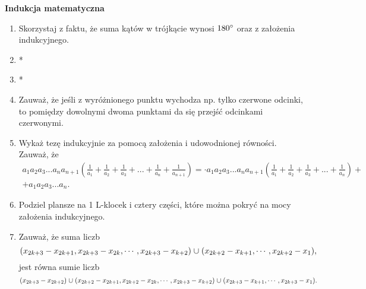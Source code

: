 \newpage
\begin{center}
	\textbf{Indukcja matematyczna}
\end{center}

\begin{enumerate}
	\item Skorzystaj z faktu, że suma kątów w trójkącie wynosi $180\degree$ oraz z założenia indukcyjnego.

	\item *

	\item *

	\item Zauważ, że jeśli z wyróżnionego punktu wychodza np. tylko czerwone odcinki, to pomiędzy dowolnymi dwoma punktami da się przejść odcinkami czerwonymi.

	\item Wykaż tezę indukcyjnie za pomocą założenia i udowodnionej równości. Zauważ, że 
	\begin{align*}
		a_1a_2a_3...a_na_{n+1}\left(\frac{1}{a_1} + \frac{1}{a_2} + \frac{1}{a_3} + ... + \frac{1}{a_n} + \frac{1}{a_{n + 1}}\right) =  \cdot a_1a_2a_3...a_na_{n+1}\left(\frac{1}{a_1} + \frac{1}{a_2} + \frac{1}{a_3} + ... + \frac{1}{a_n}\right) + \\ + a_1a_2a_3...a_n.
	\end{align*}

	\item Podziel plansze na 1 L-klocek i cztery części, które można pokryć na mocy założenia indukcyjnego.

	\item Zauważ, że suma liczb
	\[
		({x_{2k+3}-x_{2k+1},x_{2k+3}-x_{2k},\cdots,x_{2k+3}-x_{k+2}}) \thickspace {\cup}\thickspace ({x_{2k+2}-x_{k+1},\cdots,x_{2k+2}-x_1}),
	\]
	jest równa sumie liczb
	\[
		(x_{2k+3}-x_{2k+2})\thickspace {\cup}\thickspace ({x_{2k+2}-x_{2k+1},x_{2k+2}-x_{2k},\cdots,x_{2k+3}-x_{k+2}})\thickspace {\cup} \thickspace({x_{2k+3}-x_{k+1},\cdots,x_{2k+3}-x_1}).
	\]
\end{enumerate}